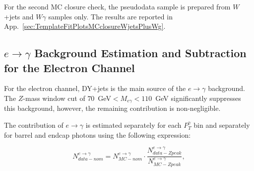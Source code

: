 For the second MC closure check, the pseudodata sample is prepared from $W$+jets and $W\gamma$ samples only. The results are reported in App.~\ref{sec:TemplateFitPlotsMCclosureWjetsPlusWg}. 

\subsection{$e\rightarrow\gamma$ Background Estimation and Subtraction for the Electron Channel}
\label{sec:BackgroundSubtraction_etog}

For the electron channel, DY+jets is the main source of the $e \rightarrow \gamma$ background. The $Z$-mass window cut of $70$~GeV$<M_{e\gamma}<110$~GeV significantly suppresses this background, however, the remaining contribution is non-negligible. 

The contribution of $e\rightarrow\gamma$ is estimated separately for each $P_{T}^{\gamma}$ bin and separately for barrel and endcap photons using the following expression: 

\begin{equation}
N_{data-nom}^{e\rightarrow\gamma} = N_{MC-nom}^{e\rightarrow\gamma} \cdot \frac{N_{data-Zpeak}^{e\rightarrow\gamma}}{N_{MC-Zpeak}^{e\rightarrow\gamma}}, 
\end{equation}

